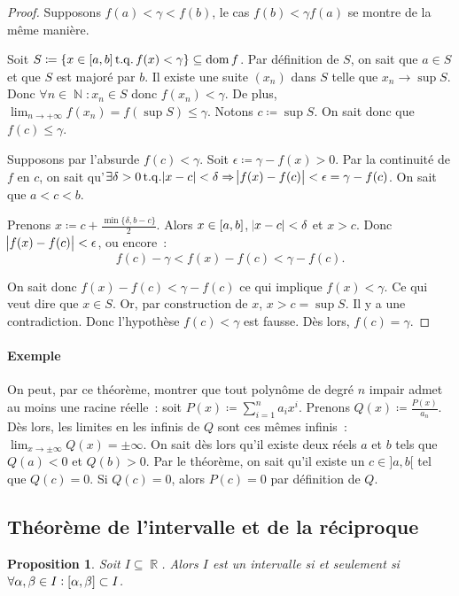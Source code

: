 \documentclass{article}
\DeclareMathOperator{\dom}{dom}
\DeclareMathOperator{\R}{\mathbb R}
\DeclareMathOperator{\N}{\mathbb N}
\DeclareMathOperator{\tq}{ t.q. }
\newcommand{\ab}{\interval ab}
\newtheorem{prp}[thm]{Proposition}
\theoremstyle{definition}
\theoremstyle{remark}
\begin{document}
		\begin{proof} Supposons $f(a) < \gamma < f(b)$, le cas $f(b) < \gamma f(a)$ se montre de la même manière.

		Soit $S \coloneqq \{x \in \ab \tq f(x) < \gamma\} \subseteq \dom f$. Par définition de $S$, on sait que $a \in S$ et que $S$ est majoré par $b$.
		Il existe une suite $(x_n)$ dans $S$ telle que $x_n \to \sup S$. Donc $\forall n \in \N : x_n \in S$ donc $f(x_n) < \gamma$. De plus,
		$\lim_{n\to+\infty}f(x_n) = f(\sup S) \leq \gamma$. Notons $c \coloneqq \sup S$. On sait donc que $f(c) \leq \gamma$.

		Supposons par l'absurde $f(c) < \gamma$. Soit $\epsilon \coloneqq \gamma - f(x) > 0$. Par la continuité de $f$ en $c$, on sait
		qu'$\exists \delta > 0 \tq \abs{x-c} < \delta \Rightarrow \abs{f(x)-f(c)} < \epsilon = \gamma-f(c)$. On sait que $a < c < b$.

		Prenons $x \coloneqq c + \frac {\min\{\delta, b-c\}}2$. Alors $x \in \ab$, $\abs{x -c} < \delta$ et $x > c$. Donc $\abs{f(x) - f(c)} < \epsilon$,
		ou encore~:
		\[f(c) - \gamma < f(x) - f(c) < \gamma - f(c).\]

		On sait donc $f(x)-f(c) < \gamma-f(c)$ ce qui implique $f(x) < \gamma$. Ce qui veut dire que $x \in S$. Or, par construction de $x$, $x > c = \sup S$.
		Il y a une contradiction. Donc l'hypothèse $f(c) < \gamma$ est fausse. Dès lors, $f(c) = \gamma$. \end{proof}

		\paragraph{Exemple} On peut, par ce théorème, montrer que tout polynôme de degré $n$ impair admet au moins une racine réelle~: soit
		$P(x) \coloneqq \sum_{i=1}^{n}a_ix^i$. Prenons $Q(x) \coloneqq \frac {P(x)}{a_n}$. Dès lors, les limites en les infinis de $Q$ sont ces mêmes infinis~:
		$\lim_{x\to\pm\infty}Q(x) = \pm\infty$. On sait dès lors qu'il existe deux réels $a$ et $b$ tels que $Q(a) < 0$ et $Q(b) > 0$. Par le théorème, on sait qu'il
		existe un $c \in ]a, b[$ tel que $Q(c) = 0$. Si $Q(c) = 0$, alors $P(c) = 0$ par définition de $Q$.
	
	\subsection{Théorème de l'intervalle et de la réciproque}
		
		\begin{prp} Soit $I \subseteq \R$. Alors $I$ est un intervalle si et seulement si $\forall \alpha, \beta \in I : \interval \alpha\beta \subset I$.
		\end{prp}
\end{document}
